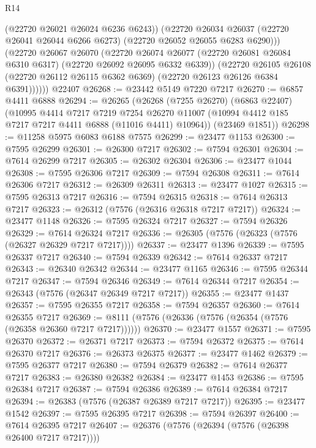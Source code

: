 \begin{lexlean}{R14}
\begin{coremodule}
              (@22720 @26021 @26024 @6236 @6243))
            (@22720
              @26034
              @26037
              (@22720 @26041 @26044 @6266 @6273)
              (@22720 @26052 @26055 @6283 @6290)))
          (@22720
            @26067
            @26070
            (@22720
              @26074
              @26077
              (@22720 @26081 @26084 @6310 @6317)
              (@22720 @26092 @26095 @6332 @6339))
            (@22720
              @26105
              @26108
              (@22720 @26112 @26115 @6362 @6369)
              (@22720 @26123 @26126 @6384 @6391))))))
    @22407
@26268 := @23442 @5149 @7220 @7217
@26270 := @6857 @4411 @6888
@26294 := @26265
    (@26268
      (@7255 @26270)
      (@6863 @22407)
      (@10995
        @4414
        @7217
        @7219
        @7254
        @26270
        @11007
        (@10994 @4412 @185 @7217 @7217 @4411 @6888 (@11016 @4411) @10964))
      (@23469 @1851))
@26298 := @11258 @5975 @6083 @6188 @7575
@26299 := @23477 @1153
@26300 := @7595 @26299
@26301 := @26300 @7217
@26302 := @7594 @26301
@26304 := @7614 @26299 @7217
@26305 := @26302 @26304
@26306 := @23477 @1044
@26308 := @7595 @26306 @7217
@26309 := @7594 @26308
@26311 := @7614 @26306 @7217
@26312 := @26309 @26311
@26313 := @23477 @1027
@26315 := @7595 @26313 @7217
@26316 := @7594 @26315
@26318 := @7614 @26313 @7217
@26323 := @26312 (@7576 (@26316 @26318 @7217 @7217))
@26324 := @23477 @1148
@26326 := @7595 @26324 @7217
@26327 := @7594 @26326
@26329 := @7614 @26324 @7217
@26336 := @26305 (@7576 (@26323 (@7576 (@26327 @26329 @7217 @7217))))
@26337 := @23477 @1396
@26339 := @7595 @26337 @7217
@26340 := @7594 @26339
@26342 := @7614 @26337 @7217
@26343 := @26340 @26342
@26344 := @23477 @1165
@26346 := @7595 @26344 @7217
@26347 := @7594 @26346
@26349 := @7614 @26344 @7217
@26354 := @26343 (@7576 (@26347 @26349 @7217 @7217))
@26355 := @23477 @1437
@26357 := @7595 @26355 @7217
@26358 := @7594 @26357
@26360 := @7614 @26355 @7217
@26369 := @8111 (@7576 (@26336 (@7576 (@26354 (@7576 (@26358 @26360 @7217 @7217))))))
@26370 := @23477 @1557
@26371 := @7595 @26370
@26372 := @26371 @7217
@26373 := @7594 @26372
@26375 := @7614 @26370 @7217
@26376 := @26373 @26375
@26377 := @23477 @1462
@26379 := @7595 @26377 @7217
@26380 := @7594 @26379
@26382 := @7614 @26377 @7217
@26383 := @26380 @26382
@26384 := @23477 @1453
@26386 := @7595 @26384 @7217
@26387 := @7594 @26386
@26389 := @7614 @26384 @7217
@26394 := @26383 (@7576 (@26387 @26389 @7217 @7217))
@26395 := @23477 @1542
@26397 := @7595 @26395 @7217
@26398 := @7594 @26397
@26400 := @7614 @26395 @7217
@26407 := @26376 (@7576 (@26394 (@7576 (@26398 @26400 @7217 @7217))))

\end{coremodule}
\end{lexlean}

